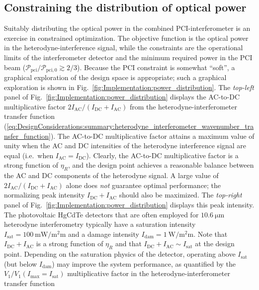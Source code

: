 \subsection{Constraining the distribution of optical power}
\label{sec:Implementation:PowerDistribution:constraints}
Suitably distributing the optical power in the combined PCI-interferometer
is an exercise in constrained optimization.
The objective function is the optical power
in the heterodyne-interference signal, while the constraints are
the operational limits of the interferometer detector and
the minimum required power in the PCI beam
($\mathcal{P}_{\text{pci}} / \mathcal{P}_{\text{pci},0} \gtrsim 2 / 3$).
Because the PCI constraint is somewhat ``soft'',
a graphical exploration of the design space is appropriate;
such a graphical exploration is shown in
Fig.~\ref{fig:Implementation:power_distribution}.
The \emph{top-left} panel of
Fig.~\ref{fig:Implementation:power_distribution}
displays the AC-to-DC multiplicative factor
$2 I_{\text{AC}} / (I_{\text{DC}} + I_{\text{AC}})$
from the heterodyne-interferometer transfer function
(\ref{eq:DesignConsiderations:summary:heterodyne_interferometer_wavenumber_transfer_function}).
The AC-to-DC multiplicative factor attains a maximum value of unity when
the AC and DC intensities of the heterodyne interference signal are equal
(i.e.\ when $I_{\text{AC}} = I_{\text{DC}}$).
Clearly, the AC-to-DC multiplicative factor
is a strong function of $\eta_R$, and
the design point achieves a reasonable balance
between the AC and DC components of the heterodyne signal.
A large value of $2 I_{\text{AC}} / (I_{\text{DC}} + I_{\text{AC}})$ alone
does \emph{not} guarantee optimal performance;
the normalizing peak intensity $I_{\text{DC}} + I_{\text{AC}}$
should also be maximized.
The \emph{top-right} panel of
Fig.~\ref{fig:Implementation:power_distribution}
displays this peak intensity.
The photovoltaic HgCdTe detectors that are often employed
for $\SI{10.6}{\micro\meter}$ heterodyne interferometry typically have
a saturation intensity
$I_{\text{sat}} = \SI{100}{\milli\watt\per\square\milli\meter}$
and a damage intensity
$I_{\text{dam}} = \SI{1}{\watt\per\square\milli\meter}$.
Note that $I_{\text{DC}} + I_{\text{AC}}$
is a strong function of $\eta_R$
and that $I_{\text{DC}} + I_{\text{AC}} \sim I_{\text{sat}}$
at the design point.
Depending on the saturation physics of the detector,
operating above $I_{\text{sat}}$ (but below $I_{\text{dam}}$)
may improve the system performance, as quantified by the
$V_1 / V_1(I_{\text{max}} = I_{\text{sat}})$ multiplicative factor
in the heterodyne-interferometer transfer function
